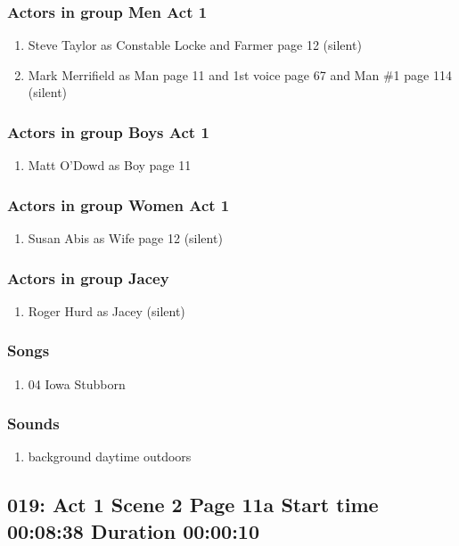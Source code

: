 \subsubsection{Actors in group Men Act 1}
\begin{enumerate}
\item Steve Taylor as Constable Locke and Farmer page 12 (silent)
\item Mark Merrifield as Man page 11 and 1st voice page 67 and Man \#1 page 114 (silent)
\end{enumerate}
\subsubsection{Actors in group Boys Act 1}
\begin{enumerate}
\item Matt O'Dowd as Boy page 11
\end{enumerate}
\subsubsection{Actors in group Women Act 1}
\begin{enumerate}
\item Susan Abis as Wife page 12 (silent)
\end{enumerate}
\subsubsection{Actors in group Jacey}
\begin{enumerate}
\item Roger Hurd as Jacey (silent)
\end{enumerate}

\subsubsection{Songs}
\begin{enumerate}
\item 04 Iowa Stubborn
\end{enumerate}\subsubsection{Sounds}
\begin{enumerate}
\item background daytime outdoors
\end{enumerate}
\subsection{019: Act 1 Scene 2 Page 11a Start time 00:08:38 Duration 00:00:10}

